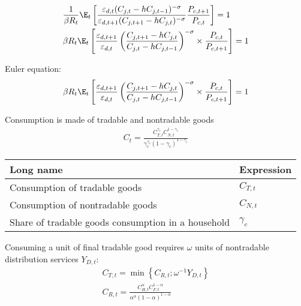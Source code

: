 \begin{align}
                                              & \frac{1}{\beta R_t}\E_t\left[ \frac{\varepsilon_{d,t}(C_{j,t} - hC_{j,t-1})^{-\sigma}}{\varepsilon_{d,t+1}(C_{j,t+1} - hC_{j,t})^{-\sigma}}\frac{P_{c,t+1}}{P_{c,t}}\right]  = 1                                                                              \\
                                              & \beta R_t\E_t\left[ \frac{\varepsilon_{d,t+1}}{\varepsilon_{d,t}}\left(\frac{C_{j,t+1} - hC_{j,t}}{C_{j,t} - hC_{j,t-1}}\right)^{-\sigma} \times \frac{P_{c,t}}{P_{c,t+1}}\right] = 1
\end{align}

Euler equation:
\begin{align}
    \beta R_t\E_t\left[ \frac{\varepsilon_{d,t+1}}{\varepsilon_{d,t}}\left(\frac{C_{j,t+1} - hC_{j,t}}{C_{j,t} - hC_{j,t-1}}\right)^{-\sigma} \times \frac{P_{c,t}}{P_{c,t+1}}\right] = 1
\end{align}









\pagebreak
Consumption is made of tradable and nontradable goods
\begin{align}
    C_t=\frac{C_{T, t}^{\gamma_c} C_{N, t}^{1-\gamma_c}}{\gamma_c^{\gamma_c}\left(1-\gamma_c\right)^{1-\gamma_c}}
\end{align}

\begin{table}[ht]
    \begin{tabular}{ll}
        \textbf{Long name}                                 & \textbf{Expression} \\ \hline \hline
        Consumption of tradable goods                      & $C_{T, t}$          \\
        Consumption of nontradable goods                   & $C_{N, t}$          \\
        Share of tradable goods consumption in a household & $\gamma_c$
    \end{tabular}
\end{table}

Consuming a unit of final tradable good requires $\omega$ units of nontradable distribution services $Y_{D, t}$:
\begin{align}
    C_{T, t} = \min \left\{  C_{R, t}; \omega^{-1}Y_{D,t} \right\} \\
    C_{R, t} = \frac{C_{H,t}^{\alpha}  C_{F,t}^{1-\alpha}}{\alpha^{\alpha} (1-\alpha)^{1-\alpha}}
\end{align}

